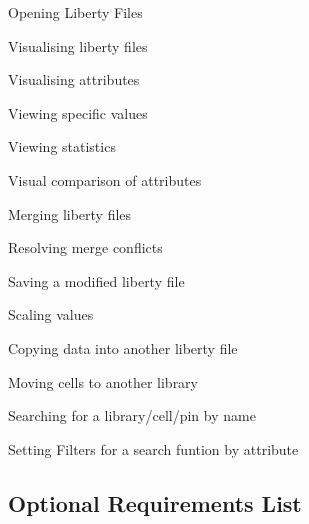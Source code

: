 \documentclass[10pt,a4paper]{report}
\begin{document}
\begin{FR}
    \item Opening Liberty Files \label{FR-1}
    \item Visualising liberty files \label{FR-2}
    \item Visualising attributes \label{FR-3}
    \item Viewing specific values \label{FR-4}
    \item Viewing statistics \label{FR-5}
    \item Visual comparison of attributes \label{FR-6}
    \item Merging liberty files \label{FR-7}
    \item Resolving merge conflicts \label{FR-8}
    \item Saving a modified liberty file \label{FR-9}
    \item Scaling values \label{FR-10}
    \item Copying data into another liberty file \label{FR-11}
    \item Moving cells to another library \label{FR-12}
    \item Searching for a library/cell/pin by name \label{FR-13}
    \item Setting Filters for a search funtion by attribute \label{FR-14}
\end{FR}
\subsection{Optional Requirements List}
\end{document}
